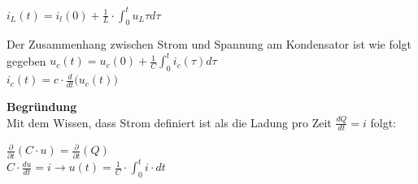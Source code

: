 $\displaystyle  i_L(t) = i_l(0) + \frac{1}{L} \cdot \int_0^t u_L{\tau} d\tau$

\formulaEnd
\iend


\begingl
Der Zusammenhang zwischen Strom und Spannung am Kondensator ist wie folgt gegeben
\formulaBegin
$\displaystyle u_c(t) = u_c(0) + \frac{1}{C} \int_0^t i_c(\tau) d\tau$ \\

$\displaystyle i_c(t) = c \cdot \frac{d}{d t} \big(u_c(t) \big)$ \\
\formulaEnd
\iend


\textbf{Begründung} \\
Mit dem Wissen, dass Strom definiert ist als die Ladung pro Zeit $ \displaystyle \frac{dQ}{dt} = i$ folgt: \\
\begin{center}
	$\displaystyle \frac{\partial}{\partial t} (C \cdot u) = \frac{\partial}{\partial t} (Q) $ \\
	$ \displaystyle C  \cdot \frac{du}{dt} = i \rightarrow u(t) = \frac{1}{C} \cdot \int_0^t i \cdot dt$
\end{center}
